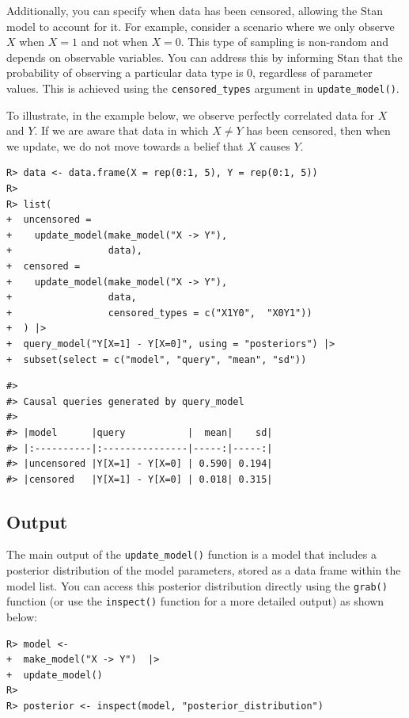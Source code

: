\documentclass[
  11pt,
  article]{jss}
\begin{document}
Additionally, you can specify when data has been censored, allowing the
Stan model to account for it. For example, consider a scenario where we
only observe \(X\) when \(X=1\) and not when \(X=0\). This type of
sampling is non-random and depends on observable variables. You can
address this by informing Stan that the probability of observing a
particular data type is \(0\), regardless of parameter values. This is
achieved using the \texttt{censored\_types} argument in
\texttt{update\_model()}.

To illustrate, in the example below, we observe perfectly correlated
data for \(X\) and \(Y\). If we are aware that data in which
\(X \neq Y\) has been censored, then when we update, we do not move
towards a belief that \(X\) causes \(Y\).

\begin{verbatim}
R> data <- data.frame(X = rep(0:1, 5), Y = rep(0:1, 5))
R> 
R> list(
+  uncensored = 
+    update_model(make_model("X -> Y"),
+                 data),
+  censored = 
+    update_model(make_model("X -> Y"), 
+                 data, 
+                 censored_types = c("X1Y0",  "X0Y1"))
+  ) |>
+  query_model("Y[X=1] - Y[X=0]", using = "posteriors") |> 
+  subset(select = c("model", "query", "mean", "sd"))
\end{verbatim}

\begin{verbatim}
#> 
#> Causal queries generated by query_model
#> 
#> |model      |query           |  mean|    sd|
#> |:----------|:---------------|-----:|-----:|
#> |uncensored |Y[X=1] - Y[X=0] | 0.590| 0.194|
#> |censored   |Y[X=1] - Y[X=0] | 0.018| 0.315|
\end{verbatim}

\subsection{Output}\label{output}

The main output of the \texttt{update\_model()} function is a model that
includes a posterior distribution of the model parameters, stored as a
data frame within the model list. You can access this posterior
distribution directly using the \texttt{grab()} function (or use the
\texttt{inspect()} function for a more detailed output) as shown below:

\begin{verbatim}
R> model <-
+  make_model("X -> Y")  |> 
+  update_model()
R> 
R> posterior <- inspect(model, "posterior_distribution")  
\end{verbatim}
\end{document}
